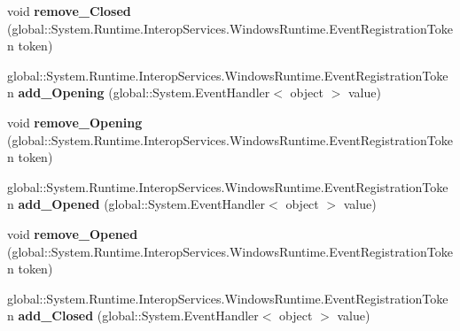 \begin{DoxyCompactItemize}
void {\bfseries remove\+\_\+\+Closed} (global\+::\+System.\+Runtime.\+Interop\+Services.\+Windows\+Runtime.\+Event\+Registration\+Token token)
\item 
\mbox{\label{interface_windows_1_1_u_i_1_1_xaml_1_1_controls_1_1_primitives_1_1_i_flyout_base_a2d94b89f80d0c8f635b98b2c6886a573}} 
global\+::\+System.\+Runtime.\+Interop\+Services.\+Windows\+Runtime.\+Event\+Registration\+Token {\bfseries add\+\_\+\+Opening} (global\+::\+System.\+Event\+Handler$<$ object $>$ value)
\item 
\mbox{\label{interface_windows_1_1_u_i_1_1_xaml_1_1_controls_1_1_primitives_1_1_i_flyout_base_acf6768490edf1a9db765685184ebccf0}} 
void {\bfseries remove\+\_\+\+Opening} (global\+::\+System.\+Runtime.\+Interop\+Services.\+Windows\+Runtime.\+Event\+Registration\+Token token)
\item 
\mbox{\label{interface_windows_1_1_u_i_1_1_xaml_1_1_controls_1_1_primitives_1_1_i_flyout_base_a7f385a5013f8ec0a8b1a6d77d6a84a3c}} 
global\+::\+System.\+Runtime.\+Interop\+Services.\+Windows\+Runtime.\+Event\+Registration\+Token {\bfseries add\+\_\+\+Opened} (global\+::\+System.\+Event\+Handler$<$ object $>$ value)
\item 
\mbox{\label{interface_windows_1_1_u_i_1_1_xaml_1_1_controls_1_1_primitives_1_1_i_flyout_base_aaf1d9a6eb5c861ece4f282be39177530}} 
void {\bfseries remove\+\_\+\+Opened} (global\+::\+System.\+Runtime.\+Interop\+Services.\+Windows\+Runtime.\+Event\+Registration\+Token token)
\item 
\mbox{\label{interface_windows_1_1_u_i_1_1_xaml_1_1_controls_1_1_primitives_1_1_i_flyout_base_a287be71b4a8d75e70c344f8fb9181cda}} 
global\+::\+System.\+Runtime.\+Interop\+Services.\+Windows\+Runtime.\+Event\+Registration\+Token {\bfseries add\+\_\+\+Closed} (global\+::\+System.\+Event\+Handler$<$ object $>$ value)
\item 
\mbox{\label{interface_windows_1_1_u_i_1_1_xaml_1_1_controls_1_1_primitives_1_1_i_flyout_base_a2325f07fa64baf0f9a5db42d74dc2072}} 

\end{DoxyCompactItemize}
